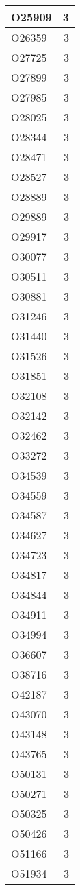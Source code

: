 \documentclass[
]{book}
\theoremstyle{definition}
\theoremstyle{definition}
\theoremstyle{definition}
\theoremstyle{definition}
\theoremstyle{remark}
\begin{document}
\begin{table}
\begin{tabular}{l|r}
\hline
O25909 & 3\\
\hline
O26359 & 3\\
\hline
O27725 & 3\\
\hline
O27899 & 3\\
\hline
O27985 & 3\\
\hline
O28025 & 3\\
\hline
O28344 & 3\\
\hline
O28471 & 3\\
\hline
O28527 & 3\\
\hline
O28889 & 3\\
\hline
O29889 & 3\\
\hline
O29917 & 3\\
\hline
O30077 & 3\\
\hline
O30511 & 3\\
\hline
O30881 & 3\\
\hline
O31246 & 3\\
\hline
O31440 & 3\\
\hline
O31526 & 3\\
\hline
O31851 & 3\\
\hline
O32108 & 3\\
\hline
O32142 & 3\\
\hline
O32462 & 3\\
\hline
O33272 & 3\\
\hline
O34539 & 3\\
\hline
O34559 & 3\\
\hline
O34587 & 3\\
\hline
O34627 & 3\\
\hline
O34723 & 3\\
\hline
O34817 & 3\\
\hline
O34844 & 3\\
\hline
O34911 & 3\\
\hline
O34994 & 3\\
\hline
O36607 & 3\\
\hline
O38716 & 3\\
\hline
O42187 & 3\\
\hline
O43070 & 3\\
\hline
O43148 & 3\\
\hline
O43765 & 3\\
\hline
O50131 & 3\\
\hline
O50271 & 3\\
\hline
O50325 & 3\\
\hline
O50426 & 3\\
\hline
O51166 & 3\\
\hline
O51934 & 3\\

\end{tabular}
\end{table}
\end{document}
